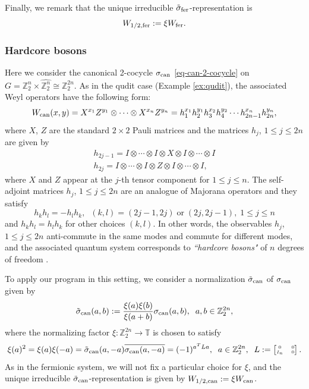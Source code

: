 \documentclass[12pt,reqno]{amsart}
\theoremstyle{definition}
\theoremstyle{definition}
\theoremstyle{definition}
\numberwithin{thm}{section}
\numberwithin{equation}{section}
\newcommand{\tor}{\mathbb{T}}
\newcommand{\z}{\mathbb{Z}}
\begin{document}
Finally, we remark that the unique irreducible $\tilde{\sigma}_{\rm fer}$-representation is
    $$W_{1/2,{\rm fer}}:=\xi W_{\rm fer}.$$


\subsubsection{Hardcore bosons}\label{subsubsec-hard-core-boson}
Here we consider the canonical 2-cocycle $\sigma_{\rm can}$ \eqref{eq-can-2-cocycle} on $G = \z^n_2 \times \widehat{\z^n_2} \cong \z^{2n}_2$. As in the qudit case (Example \ref{ex:qudit}), the associated Weyl operators have the following form:
\begin{equation}\label{eq-W-hardcore}
    W_{\rm can}(x,y)= X^{x_1}Z^{y_1}\otimes \cdots \otimes X^{x_n}Z^{y_n} = h^{x_1}_1h^{y_1}_2h^{x_2}_3h^{y_2}_4\cdots h^{x_n}_{2n-1}h^{y_n}_{2n},
\end{equation}
where $X$, $Z$ are the standard $2\times 2$ Pauli matrices and the matrices $h_j$, $1\le j\le 2n$ are given by
\begin{align*}
    h_{2j-1} = I\otimes \cdots \otimes I \otimes X \otimes I \otimes \cdots \otimes I\\
    h_{2j} = I\otimes \cdots \otimes I \otimes Z\otimes I\otimes \cdots \otimes I,
\end{align*}
where $X$ and $Z$ appear at the $j$-th tensor component for $1\le j\le n$.
The self-adjoint matrices $h_j$, $1\le j\le 2n$ are an analogue of Majorana operators and they satisfy
    $$h_kh_l = - h_lh_k,\;\; (k,l) = (2j-1,2j)\; \text{or}\; (2j,2j-1),\; 1\le j\le n$$
and $h_kh_l = h_lh_k$ for other choices $(k,l)$. In other words, the observables $h_j$, $1\le j\le 2n$ anti-commute in the same modes and commute for different modes, and the associated quantum system corresponds to {\em ``hardcore bosons"} of $n$ degrees of freedom \cite[Section II]{CL}.

To apply our program in this setting, we consider a normalization $\tilde{\sigma}_{\rm can}$ of $\sigma_{\rm can}$ given by
    \begin{equation}\label{eq-normalization-hardcore}
        \tilde{\sigma}_{\rm can}( a , b ):=\frac{\xi( a )\xi( b )}{\xi( a + b )}\sigma_{\rm can}( a , b ),\;\; a,b \in \z^{2n}_2,
    \end{equation}
where the normalizing factor $\xi:\z_2^{2n}\to \tor$ is chosen to satisfy
    $$\xi( a )^2=\xi(a)\xi(-a)=\tilde{\sigma}_{\rm can}( a ,- a )\overline{\sigma_{\rm can}( a ,- a )}=(-1)^{ a ^T L a },\;\; a\in \z^{2n}_2,\;\; L:=\tiny\begin{bmatrix} 0 & 0 \\ I_n & 0 \end{bmatrix}.$$
As in the fermionic system, we will not fix a particular choice for $\xi$, and the unique irreducible $\tilde{\sigma}_{\rm can}$-representation is given by
$W_{1/2,{\rm can}}:=\xi W_{\rm can}$.
\end{document}
